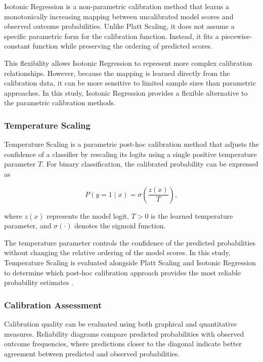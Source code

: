 Isotonic Regression is a non-parametric calibration method that learns a
monotonically increasing mapping between uncalibrated model scores and
observed outcome probabilities. Unlike Platt Scaling, it does not assume a
specific parametric form for the calibration function. Instead, it fits a
piecewise-constant function while preserving the ordering of predicted
scores.

This flexibility allows Isotonic Regression to represent more complex
calibration relationships. However, because the mapping is learned directly
from the calibration data, it can be more sensitive to limited sample sizes
than parametric approaches. In this study, Isotonic Regression provides a
flexible alternative to the parametric calibration methods.

\subsubsection{Temperature Scaling}

Temperature Scaling is a parametric post-hoc calibration method that
adjusts the confidence of a classifier by rescaling its logits using a
single positive temperature parameter $T$. For binary classification, the
calibrated probability can be expressed as

\begin{equation}
P(y=1 \mid x) =
\sigma\left(\frac{z(x)}{T}\right),
\end{equation}

where $z(x)$ represents the model logit, $T>0$ is the learned temperature
parameter, and $\sigma(\cdot)$ denotes the sigmoid function.

The temperature parameter controls the confidence of the predicted
probabilities without changing the relative ordering of the model scores.
In this study, Temperature Scaling is evaluated alongside Platt Scaling and
Isotonic Regression to determine which post-hoc calibration approach
provides the most reliable probability estimates
\cite{balanya_temperature_2024, penso_medical_calibration_2024}.

\subsubsection{Calibration Assessment}

Calibration quality can be evaluated using both graphical and quantitative
measures. Reliability diagrams compare predicted probabilities with
observed outcome frequencies, where predictions closer to the diagonal
indicate better agreement between predicted and observed probabilities.

